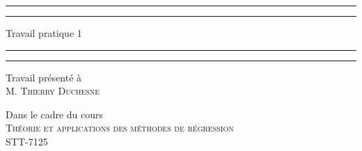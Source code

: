 \documentclass{article}
\begin{document}
	\renewcommand{\tablename}{Tableau}
	\renewcommand{\figurename}{Illustration}
	\renewcommand{\P}{\mathbb{P}}
	
	\begin{titlepage}
		\centering %
		
		\scshape %
		
		\vspace*{7\baselineskip} %
		
		
		\rule{\textwidth}{1.6pt}\vspace*{-\baselineskip}\vspace*{2pt} %
		\rule{\textwidth}{0.4pt} %
		
		\vspace{0.75\baselineskip} %
		{\LARGE Travail pratique 1\\} %
		\vspace{0.75\baselineskip} %
		
		\rule{\textwidth}{0.4pt}\vspace*{-\baselineskip}\vspace{3.2pt} %
		\rule{\textwidth}{1.6pt} %
		
		\vspace{4\baselineskip} %
		
		
		Travail présenté à \\
		{\scshape\Large M. Thierry Duchesne\\}
		
		\vspace*{4\baselineskip}
		
		Dans le cadre du cours\\
		{\scshape\Large Théorie et applications des méthodes de régression \\ STT-7125}
		
		
		\vspace*{4\baselineskip} %
		

\end{titlepage}
\end{document}
